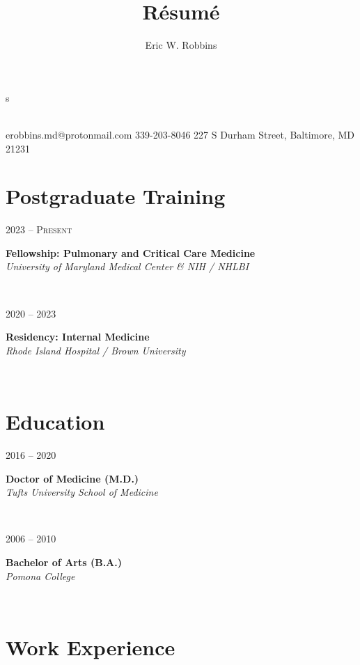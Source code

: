 s\documentclass{article}
\title{R\'esum\'e}
\author{Eric W. Robbins}
\date{}
\makeatletter
\newcommand\colleft{.20}
\newcommand\colright{.75}
\newcommand\mohan{Mohan Thanikachalam, MD}
\newcommand{\entryfour}[4]
	{
		\begin{minipage}[t]{\colleft\textwidth}
		\hfill \textsc{#1}
		\end{minipage}
		\hfill\vline\hfill
		\begin{minipage}[t]{\colright\textwidth}
		{\bf#2}\\
		\textit{#3}
		\footnotesize{#4}
		\end{minipage}\\
		\entryvspace
	}%
\newcommand{\entryvspace}{\vspace{0.5em}}
\newcommand{\fellowship}{University of Maryland Medical Center \& NIH / NHLBI}
\newcommand{\residency}{Rhode Island Hospital / Brown University}
\newcommand{\medschool}{Tufts University School of Medicine}
\newcommand{\undergrad}{Pomona College}
\newcommand{\cphone}{339-203-8046}
\newcommand{\address}{227 S Durham Street, Baltimore, MD 21231}
\newcommand{\email}{erobbins.md@protonmail.com}
\renewcommand{\maketitle}{
\begin{center}
	{\huge\bfseries\theauthor}
	\vspace{0.25em}\\
	\email
	\hspace{1em}\vline \hspace{1em}%
	\cphone
	\hspace{1em}\vline \hspace{1em}
	\address
\end{center}
}
\makeatother
\begin{document}
	\maketitle
	
		\section*{Postgraduate Training}
	\entryfour{2023 -- Present}
	{Fellowship: Pulmonary and Critical Care Medicine}
	{\fellowship}
	{}
	
	\entryfour{2020 -- 2023}
	{Residency: Internal Medicine}
	{\residency}
	{}
	
	\section*{Education}
		\entryfour{2016 -- 2020}
			{Doctor of Medicine (M.D.)}
			{\medschool}
			{}%
			
		\entryfour{2006 -- 2010}
		{Bachelor of Arts (B.A.)}
		{\undergrad}
		{}%

	\section*{Work Experience}

		
\end{document}

